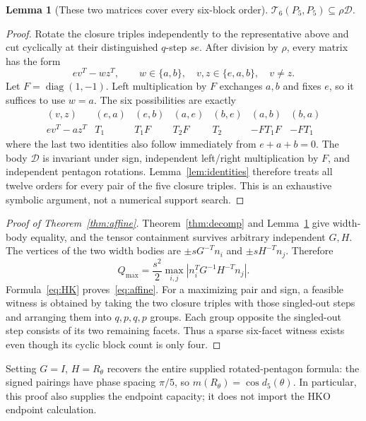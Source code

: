 \documentclass[11pt,a4paper]{article}
\newtheorem{lemma}[theorem]{Lemma}
\theoremstyle{definition}\newtheorem{definition}[theorem]{Definition}
\theoremstyle{remark}\newtheorem{remark}[theorem]{Remark}
\newcommand{\Tsix}{\mathcal T_6}
\begin{document}
\begin{lemma}[These two matrices cover every six-block order]\label{lem:allorders}
$\Tsix(P_5,P_5)\subseteq\rho\mathcal D$.
\end{lemma}
\begin{proof}
Rotate the closure triples independently to the representative above and cut cyclically at their distinguished $q$-step $se$. After division by $\rho$, every matrix has the form
\[
 ev^T-wz^T,\qquad w\in\{a,b\},\quad v,z\in\{e,a,b\},\quad v\ne z.
\]
Let $F=\operatorname{diag}(1,-1)$. Left multiplication by $F$ exchanges $a,b$ and fixes $e$, so it suffices to use $w=a$. The six possibilities are exactly
\[
\begin{array}{c|cccccc}
(v,z)&(e,a)&(e,b)&(a,e)&(b,e)&(a,b)&(b,a)\\\hline
 ev^T-az^T&T_1&T_1F&T_2F&T_2&-FT_1F&-FT_1
\end{array}
\]
where the last two identities also follow immediately from $e+a+b=0$. The body $\mathcal D$ is invariant under sign, independent left/right multiplication by $F$, and independent pentagon rotations. Lemma~\ref{lem:identities} therefore treats all twelve orders for every pair of the five closure triples. This is an exhaustive symbolic argument, not a numerical support search.
\end{proof}

\begin{proof}[Proof of Theorem~\ref{thm:affine}]
Theorem~\ref{thm:decomp} and Lemma~\ref{lem:allorders} give width-body equality, and the tensor containment survives arbitrary independent $G,H$. The vertices of the two width bodies are $\pm sG^{-T}n_i$ and $\pm sH^{-T}n_j$. Therefore
\[
 Q_{\max}=\frac{s^2}{2}\max_{i,j}|n_i^TG^{-1}H^{-T}n_j|.
\]
Formula~\eqref{eq:HK} proves~\eqref{eq:affine}. For a maximizing pair and sign, a feasible witness is obtained by taking the two closure triples with those singled-out steps and arranging them into $q,p,q,p$ groups. Each group opposite the singled-out step consists of its two remaining facets. Thus a sparse six-facet witness exists even though its cyclic block count is only four.
\end{proof}

Setting $G=I$, $H=R_\theta$ recovers the entire supplied rotated-pentagon formula: the signed pairings have phase spacing $\pi/5$, so $m(R_\theta)=\cos d_5(\theta)$. In particular, this proof also supplies the endpoint capacity; it does not import the HKO endpoint calculation.
\end{document}
